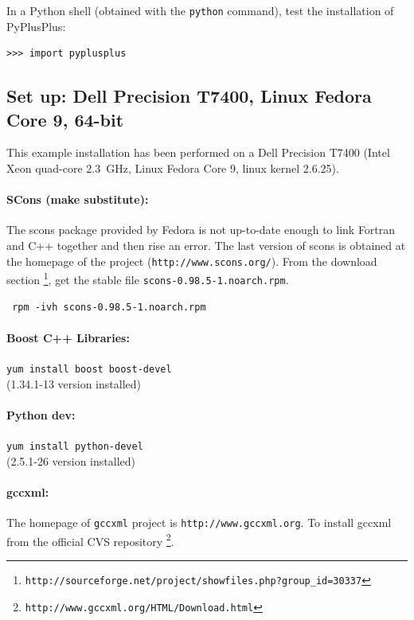 \documentclass[12pt,a4paper]{article}
\begin{document}
In a Python shell (obtained with the {\tt python} command), test the installation
of PyPlusPlus:
\begin{verbatim}
>>> import pyplusplus
\end{verbatim}



\subsection{Set up: Dell Precision T7400, Linux Fedora Core 9, 64-bit}
This example installation has been performed on a Dell Precision T7400 (Intel
Xeon quad-core 2.3~GHz, Linux Fedora Core 9, linux kernel 2.6.25).

\paragraph{SCons (make substitute):}
The scons package provided by Fedora is not up-to-date enough to link Fortran and C++ together and then rise an
error. The last version of scons is obtained at the homepage of the project ({\tt  http://www.scons.org/}).
From the download section \footnote{\tt http://sourceforge.net/project/showfiles.php?group\_id=30337}, 
get the stable file {\tt scons-0.98.5-1.noarch.rpm}.

\begin{verbatim}
 rpm -ivh scons-0.98.5-1.noarch.rpm
\end{verbatim}

\paragraph{Boost C++ Libraries:} {\tt yum install boost boost-devel} \\
(1.34.1-13 version installed)

\paragraph{Python dev:} {\tt yum install python-devel} \\
(2.5.1-26 version installed)

\paragraph{gccxml:}The homepage of {\tt gccxml} project is {\tt http://www.gccxml.org}. 
To install gccxml from the official CVS repository \footnote{\tt http://www.gccxml.org/HTML/Download.html}.
\end{document}
